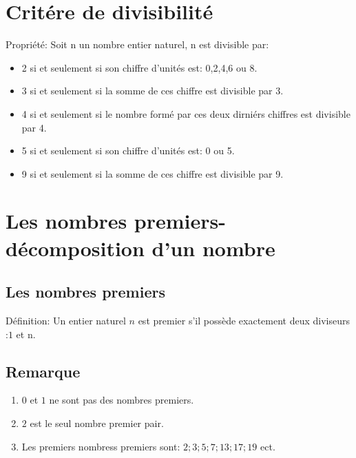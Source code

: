 \documentclass[12pt,a4paper]{book}
\begin{document}
\section{Critére de divisibilité }
\begin{tcolorbox}[colback=col3,colframe=col4,leftrule=5pt,toprule=0pt,rightrule=0pt,bottomrule=0pt,arc=0pt,outer arc=0pt,top=12pt]


\large Propriété: Soit n un nombre entier naturel, n est divisible par: 

\begin{itemize}[label=\textbullet]

\item 2 si et seulement si son chiffre d'unités est: 0,2,4,6 ou 8.
\item 3 si et seulement si la somme de ces chiffre est divisible par 3.
\item 4 si et seulement si le nombre formé par ces deux dirniérs chiffres est divisible par 4.
\item 5 si et seulement si son chiffre d'unités est: 0 ou 5.
\item 9 si et seulement si la somme de ces chiffre est divisible par 9.
\end{itemize}

\end{tcolorbox} 

\section{Les nombres premiers-décomposition d'un nombre}
\subsection{Les nombres premiers}
\begin{tcolorbox}[colback=col3,colframe=col4,leftrule=5pt,toprule=0pt,rightrule=0pt,bottomrule=0pt,arc=0pt,outer arc=0pt,top=12pt]


\large Définition:
Un entier naturel $n$ est premier s'il possède exactement deux diviseurs :$1$ et n.
\end{tcolorbox} 
\subsection{Remarque} 

\begin{enumerate}[label=\textbullet]
    \item $0$ et $1$ ne sont pas des nombres premiers.
    \item $2$ est le seul nombre premier pair.
    \item Les premiers nombress premiers sont: $2;3;5;7;13;17;19$ ect.
\end{enumerate}
\end{document}
